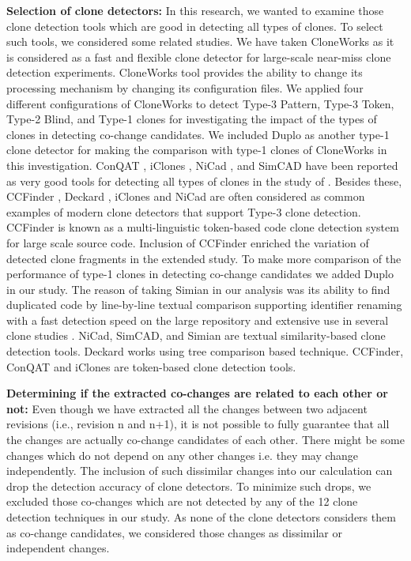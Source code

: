 \documentclass[review]{elsarticle}
\begin{document}
\vspace{1mm}
\textbf{Selection of clone detectors:} In this research, we wanted to examine those clone detection tools which are good in detecting all types of clones. To select such tools, we considered some related studies. We have taken CloneWorks \cite{CloneWorks-Jeff} as it is considered as a fast and flexible clone detector for large-scale near-miss clone detection experiments. CloneWorks tool provides the ability to change its processing mechanism by changing its configuration files. We applied four different configurations of CloneWorks to detect Type-3 Pattern, Type-3 Token, Type-2 Blind, and Type-1 clones for investigating the impact of the types of clones in detecting co-change candidates. We included Duplo \cite{DuploCloneDetection} as another type-1 clone detector for making the comparison with type-1 clones of CloneWorks in this investigation.  ConQAT \cite{conqat-clone-detecion}, iClones \cite{4812755iclones}, NiCad \cite{5970189Nicad}, and SimCAD \cite{6613857Simcad} have been reported as very good tools for detecting all types of clones in the study of \citet{jeff-evaluating}. Besides these, CCFinder \cite{CCFinderCloneDetection}, Deckard \cite{4222572Deckard}, iClones and NiCad are often considered as common examples of modern clone detectors that support Type-3 clone detection. CCFinder is known as a multi-linguistic token-based code clone detection system for large scale source code. Inclusion of CCFinder enriched the variation of detected clone fragments in the extended study.  To make more comparison of the performance of type-1 clones in detecting co-change candidates we added Duplo in our study. The reason of taking Simian \cite{simianlink} in our analysis was its ability to find duplicated code by line-by-line textual comparison supporting identifier renaming with a fast detection speed on the large repository and extensive use in several clone studies \cite{simian-used-1, Wang-2013-SBC-2491411-2491420, impact-clone-maintenance, Cheung-clones-javascript, cloning-gnome-project}. NiCad, SimCAD, and Simian are textual similarity-based clone detection tools. Deckard works using tree comparison based technique. CCFinder, ConQAT and iClones are token-based clone detection tools.

\vspace{1mm}
\textbf{Determining if the extracted co-changes are related to each other or not:} Even though we have extracted all the changes between two adjacent revisions (i.e., revision n and n+1), it is not possible to fully guarantee that all the changes are actually co-change candidates of each other. There might be some changes which do not depend on any other changes i.e. they may change independently. The inclusion of such dissimilar changes into our calculation can drop the detection accuracy of clone detectors. To minimize such drops, we excluded those co-changes which are not detected by any of the 12 clone detection techniques in our study. As none of the clone detectors considers them as co-change candidates, we considered those changes as dissimilar or independent changes. 
\end{document}
